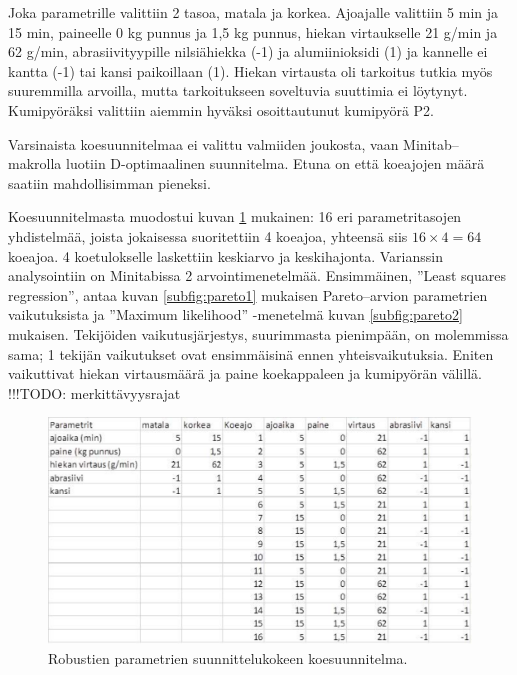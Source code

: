 \documentclass[12pt,a4paper,finnish]{tutthesis}
\newcommand\todo[1]{{\color{red}!!!TODO: #1}} %
\begin{document}
Joka parametrille valittiin 2 tasoa, matala ja korkea. Ajoajalle valittiin 5 min ja 15 min, paineelle 0 kg punnus ja 1,5 kg punnus, hiekan virtaukselle 21 g/min ja 62 g/min, abrasiivityypille nilsiähiekka (-1) ja alumiinioksidi (1) ja kannelle ei kantta (-1) tai kansi paikoillaan (1). Hiekan virtausta oli tarkoitus tutkia myös suuremmilla arvoilla, mutta tarkoitukseen soveltuvia suuttimia ei löytynyt. Kumipyöräksi valittiin aiemmin hyväksi osoittautunut kumipyörä P2.

Varsinaista koesuunnitelmaa ei valittu valmiiden joukosta, vaan Minitab–makrolla luotiin D-optimaalinen suunnitelma. Etuna on että koeajojen määrä saatiin mahdollisimman pieneksi.

Koesuunnitelmasta muodostui kuvan \ref{fig:tarray} mukainen:
16 eri parametritasojen yhdistelmää, joista jokaisessa suoritettiin 4 koeajoa, yhteensä siis \(16\times 4 = 64\) koeajoa. 4 koetulokselle laskettiin keskiarvo ja keskihajonta.
Varianssin analysointiin on Minitabissa 2 arvointimenetelmää. Ensimmäinen, ”Least squares regression”, antaa kuvan \ref{subfig:pareto1} mukaisen Pareto–arvion parametrien vaikutuksista
ja ”Maximum likelihood” -menetelmä kuvan \ref{subfig:pareto2} mukaisen.
Tekijöiden vaikutusjärjestys, suurimmasta pienimpään, on molemmissa sama;
1 tekijän vaikutukset ovat ensimmäisinä ennen yhteisvaikutuksia.
Eniten vaikuttivat hiekan virtausmäärä ja paine koekappaleen ja kumipyörän välillä.
\todo{merkittävyysrajat}

\begin{figure}
  \begin{center}
    \includegraphics[width=1.0\textwidth]{tarray}
  \end{center}
  \caption[Robustien parametrien koesuunnitelma]{Robustien parametrien suunnittelukokeen koesuunnitelma.}
  \label{fig:tarray}
\end{figure}
\end{document}
